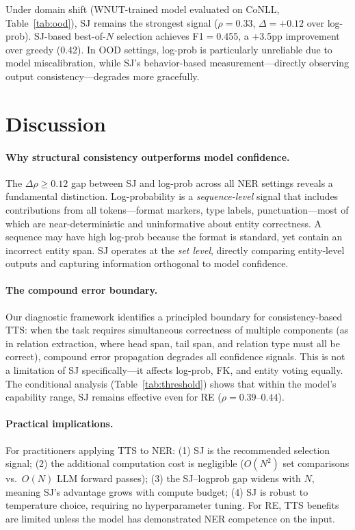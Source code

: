 \documentclass[11pt,a4paper]{article}
\begin{document}
Under domain shift (WNUT-trained model evaluated on CoNLL, Table~\ref{tab:ood}), SJ remains the strongest signal ($\rho{=}0.33$, $\Delta{=}+0.12$ over log-prob). SJ-based best-of-$N$ selection achieves F1$=$0.455, a +3.5pp improvement over greedy (0.42). In OOD settings, log-prob is particularly unreliable due to model miscalibration, while SJ's behavior-based measurement---directly observing output consistency---degrades more gracefully.

\section{Discussion}
\label{sec:discussion}

\paragraph{Why structural consistency outperforms model confidence.}
The $\Delta\rho \geq 0.12$ gap between SJ and log-prob across all NER settings reveals a fundamental distinction. Log-probability is a \emph{sequence-level} signal that includes contributions from all tokens---format markers, type labels, punctuation---most of which are near-deterministic and uninformative about entity correctness. A sequence may have high log-prob because the format is standard, yet contain an incorrect entity span. SJ operates at the \emph{set level}, directly comparing entity-level outputs and capturing information orthogonal to model confidence.

\paragraph{The compound error boundary.}
Our diagnostic framework identifies a principled boundary for consistency-based TTS: when the task requires simultaneous correctness of multiple components (as in relation extraction, where head span, tail span, and relation type must all be correct), compound error propagation degrades all confidence signals. This is not a limitation of SJ specifically---it affects log-prob, FK, and entity voting equally. The conditional analysis (Table~\ref{tab:threshold}) shows that within the model's capability range, SJ remains effective even for RE ($\rho{=}0.39$--$0.44$).

\paragraph{Practical implications.}
For practitioners applying TTS to NER: (1) SJ is the recommended selection signal; (2) the additional computation cost is negligible ($O(N^2)$ set comparisons vs.\ $O(N)$ LLM forward passes); (3) the SJ--logprob gap widens with $N$, meaning SJ's advantage grows with compute budget; (4) SJ is robust to temperature choice, requiring no hyperparameter tuning. For RE, TTS benefits are limited unless the model has demonstrated NER competence on the input.
\end{document}

